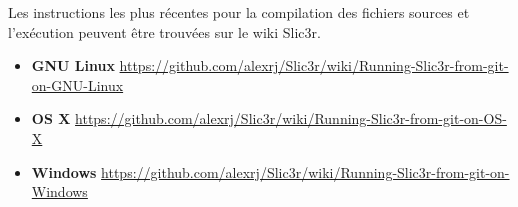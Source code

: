 Les instructions les plus r\'ecentes pour la compilation des fichiers sources et l'ex\'ecution peuvent \^etre trouv\'ees sur le wiki Slic3r.

\begin{itemize}
    \item \textbf{GNU Linux} \hfill \url{https://github.com/alexrj/Slic3r/wiki/Running-Slic3r-from-git-on-GNU-Linux}
    \item \textbf{OS X} \hfill \url{https://github.com/alexrj/Slic3r/wiki/Running-Slic3r-from-git-on-OS-X}
    \item \textbf{Windows} \hfill \url{https://github.com/alexrj/Slic3r/wiki/Running-Slic3r-from-git-on-Windows}

\end{itemize}
